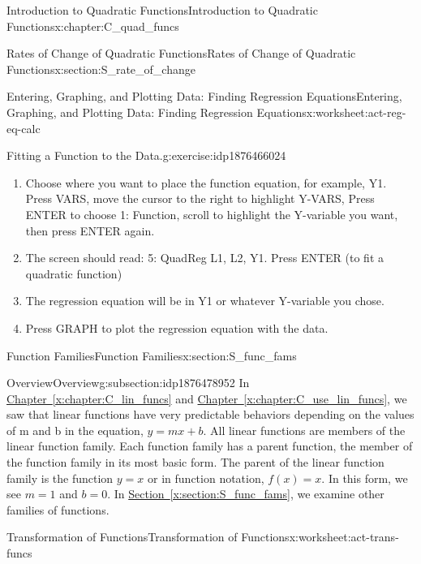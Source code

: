 \documentclass[oneside,10pt,]{book}
\newcommand{\xreffont}{\relax}
\numberwithin{equation}{chapter}
\begin{document}
\begin{chapterptx}{Introduction to Quadratic Functions}{}{Introduction to Quadratic Functions}{}{}{x:chapter:C_quad_funcs}
\begin{sectionptx}{Rates of Change of Quadratic Functions}{}{Rates of Change of Quadratic Functions}{}{}{x:section:S_rate_of_change}
\begin{worksheet-subsection}{Entering, Graphing, and Plotting Data: Finding Regression Equations}{}{Entering, Graphing, and Plotting Data: Finding Regression Equations}{}{}{x:worksheet:act-reg-eq-calc}
\begin{divisionexercise}{4}{Fitting a Function to the Data.}{}{g:exercise:idp1876466024}
\begin{enumerate}[font=\bfseries,label=(\alph*),ref=\alph*]
\item{}Choose where you want to place the function equation, for example, Y1. Press VARS, move the cursor to the right to highlight Y-VARS, Press ENTER to choose 1: Function, scroll to highlight the Y-variable you want, then press ENTER again.%
\item{}The screen should read: 5: QuadReg L1, L2, Y1. Press ENTER (to fit a quadratic function)%
\item{}The regression equation will be in Y1 or whatever Y-variable you chose.%
\item{}Press GRAPH to plot the regression equation with the data.%
\end{enumerate}
\end{divisionexercise}%
\end{worksheet-subsection}
\restoregeometry
\end{sectionptx}
%
%
\typeout{************************************************}
\typeout{************************************************}
%
\begin{sectionptx}{Function Families}{}{Function Families}{}{}{x:section:S_func_fams}
%
%
\typeout{************************************************}
\typeout{************************************************}
%
\begin{subsectionptx}{Overview}{}{Overview}{}{}{g:subsection:idp1876478952}
In \hyperref[x:chapter:C_lin_funcs]{Chapter~{\xreffont\ref{x:chapter:C_lin_funcs}}} and \hyperref[x:chapter:C_use_lin_funcs]{Chapter~{\xreffont\ref{x:chapter:C_use_lin_funcs}}}, we saw that linear functions have very predictable behaviors depending on the values of m and b in the equation, \(y = mx + b\). All linear functions are members of the linear function family. Each function family has a parent function, the member of the function family in its most basic form. The parent of the linear function family is the function \(y = x\) or in function notation, \(f(x) = x\). In this form, we see \(m = 1\) and \(b = 0\). In \hyperref[x:section:S_func_fams]{Section~{\xreffont\ref{x:section:S_func_fams}}}, we examine other families of functions.%
\end{subsectionptx}
%
%
\typeout{************************************************}
\typeout{************************************************}
%
\begin{worksheet-subsection}{Transformation of Functions}{}{Transformation of Functions}{}{}{x:worksheet:act-trans-funcs}

\end{worksheet-subsection}
\end{sectionptx}
\end{chapterptx}
\end{document}
